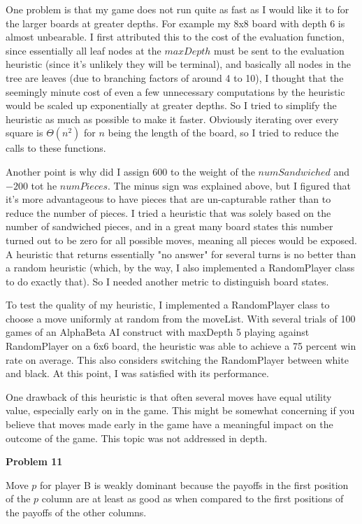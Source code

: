 \documentclass[12pt]{article}
\makeatletter
\newcommand{\exercise}[1]{\par\vspace{4ex}\normalfont\normalsize\noindent
\textbf{\large Problem #1}\par\nobreak\@afterindentfalse\@afterheading\vspace{.75ex}}
\makeatother
\begin{document}
One problem is that my game does not run quite as fast as I would like it to for the larger boards at greater depths. For example my 8x8 board with depth 6 is almost unbearable. I first attributed this to the cost of the evaluation function, since essentially all leaf nodes at the $maxDepth$ must be sent to the evaluation heuristic (since it's unlikely they will be terminal), and basically all nodes in the tree are leaves (due to branching factors of around 4 to 10), I thought that the seemingly minute cost of even a few unnecessary computations by the heuristic would be scaled up exponentially at greater depths. So I tried to simplify the heuristic as much as possible to make it faster. Obviously iterating over every square is $\Theta(n^2)$ for $n$ being the length of the board, so I tried to reduce the calls to these functions. 

Another point is why did I assign $600$ to the weight of the $numSandwiched$ and $-200$ tot he $numPieces$. The minus sign was explained above, but I figured that it's more advantageous to have pieces that are un-capturable rather than to reduce the number of pieces. I tried a heuristic that was solely based on the number of sandwiched pieces, and in a great many board states this number turned out to be zero for all possible moves, meaning all pieces would be exposed. A heuristic that returns essentially "no answer" for several turns is no better than a random heuristic (which, by the way, I also implemented a RandomPlayer class to do exactly that). So I needed another metric to distinguish board states. 

To test the quality of my heuristic, I implemented a RandomPlayer class to choose a move uniformly at random from the moveList. With several trials of 100 games of an AlphaBeta AI construct with maxDepth 5 playing against RandomPlayer on a 6x6 board, the heuristic was able to achieve a 75 percent win rate on average. This also considers switching the RandomPlayer between white and black. At this point, I was satisfied with its performance. 

One drawback of this heuristic is that often several moves have equal utility value, especially early on in the game. This might be somewhat concerning if you believe that moves made early in the game have a meaningful impact on the outcome of the game. This topic was not addressed in depth. 

\exercise{11} 
Move $p$ for player B is weakly dominant because the payoffs in the first position of the $p$ column are at least as good as when compared to the first positions of the payoffs of the other columns. 
\end{document}
